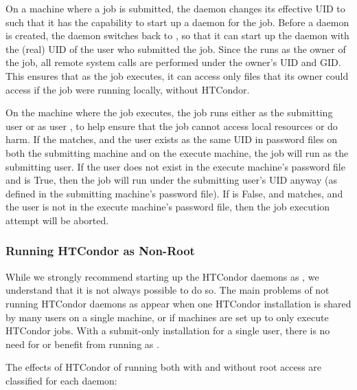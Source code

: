 On a machine where a job is submitted,
the  daemon
changes its effective UID to 
such that it has the capability to start up a  daemon
for the job.
Before a  daemon is created,
the  daemon
switches back to ,
so that it can start up the  daemon with the (real) UID
of the user who submitted the job.
Since the  runs as the owner of the job,
all remote system calls are performed under the owner's UID
and GID.
This ensures that as the job executes,
it can access only files that its owner could access if the job
were running locally, without HTCondor.

On the machine where the job executes, the 
job runs either as the submitting user or as user ,
to help ensure that the job cannot access local resources or do harm.  
If the  matches,
and the user exists as the same UID in password files
on both the submitting machine and on the execute machine,
the job will run as the submitting user.
If the user does not exist in the execute machine's
password file and  is True,
then the job will run under the submitting user's UID anyway (as
defined in the submitting machine's password file).
If  is False,
and  matches,
and the user is not in the execute machine's password file,
then the job execution attempt will be aborted.

\subsubsection{\label{sec:Non-Root}Running HTCondor as Non-Root}

While we strongly recommend starting up the HTCondor daemons as ,
we understand that it is not always possible to do so.
The main problems of not running HTCondor daemons as 
appear when one HTCondor installation is shared by many users on a
single machine, or if machines are set up to only execute
HTCondor jobs.  With a submit-only installation for a
single user, there is no need for or benefit from running as
.

The effects of HTCondor of running both with and without root access
are classified for each daemon:

